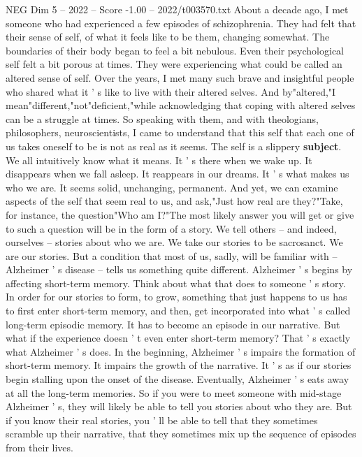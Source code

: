 \begin{textsample}{NEG Dim 5 – 2022 – Score -1.00 – 2022/t003570.txt}  \label{ex:f5_neg_034}
About a decade ago, I met someone who had experienced a few episodes of schizophrenia.
They had felt that their sense of self, of what it feels like to be them, changing somewhat.
The boundaries of their body began to feel a bit nebulous.
Even their psychological self felt a bit porous at times.
They were experiencing what could be called an altered sense of self.
Over the years, I met many such brave and insightful people who shared what it ' s like to live with their altered selves.
And by"altered,"I mean"different,"not"deficient,"while acknowledging that coping with altered selves can be a struggle at times.
So speaking with them, and with theologians, philosophers, neuroscientists, I came to understand that this self that each one of us takes oneself to be is not as real as it seems.
The self is a slippery \textbf{subject}.
We all intuitively know what it means.
It ' s there when we wake up.
It disappears when we fall asleep.
It reappears in our dreams.
It ' s what makes us who we are.
It seems solid, unchanging, permanent.
And yet, we can examine aspects of the self that seem real to us, and ask,"Just how real are they?"Take, for instance, the question"Who am I?"The most likely answer you will get or give to such a question will be in the form of a story.
We tell others -- and indeed, ourselves -- stories about who we are.
We take our stories to be sacrosanct.
We are our stories.
But a condition that most of us, sadly, will be familiar with -- Alzheimer ' s disease -- tells us something quite different.
Alzheimer ' s begins by affecting short-term memory.
Think about what that does to someone ' s story.
In order for our stories to form, to grow, something that just happens to us has to first enter short-term memory, and then, get incorporated into what ' s called long-term episodic memory.
It has to become an episode in our narrative.
But what if the experience doesn ' t even enter short-term memory?
That ' s exactly what Alzheimer ' s does.
In the beginning, Alzheimer ' s impairs the formation of short-term memory.
It impairs the growth of the narrative.
It ' s as if our stories begin stalling upon the onset of the disease.
Eventually, Alzheimer ' s eats away at all the long-term memories.
So if you were to meet someone with mid-stage Alzheimer ' s, they will likely be able to tell you stories about who they are.
But if you know their real stories, you ' ll be able to tell that they sometimes scramble up their narrative, that they sometimes mix up the sequence of episodes from their lives.

\end{textsample}
